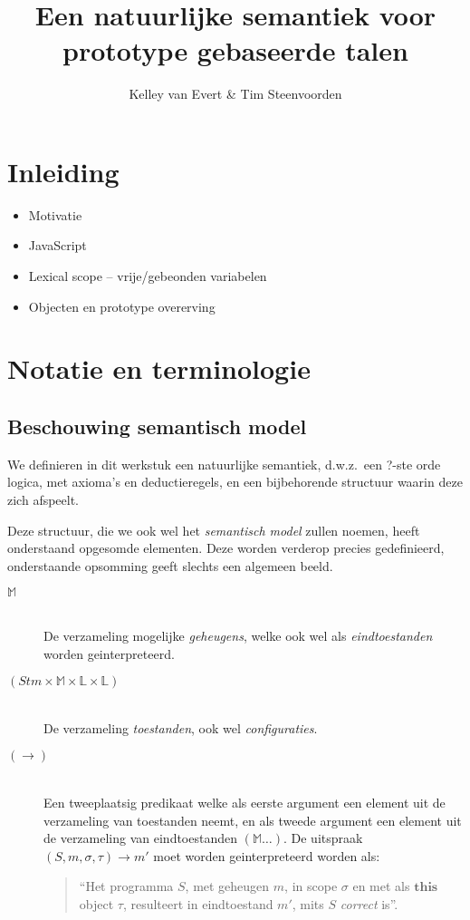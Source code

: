\documentclass
  [11pt,
   paper=a4,
   cleardouble=plain,
   chapterprefix=true,
   parskip=half,
   draft=true]
  {scrbook}
\newcommand{\<}
  {\ensuremath{\langle}}
\renewcommand{\>}
  {\ensuremath{\rangle}}
\begin{document}
\title{Een natuurlijke semantiek voor prototype gebaseerde talen}
\author{Kelley van Evert \& Tim Steenvoorden}
\maketitle

\frontmatter

\tableofcontents

\mainmatter

\chapter{Inleiding}

\begin{itemize}
	\item Motivatie
	\item JavaScript
	\item Lexical scope -- vrije/gebeonden variabelen
	\item Objecten en prototype overerving
\end{itemize}

\chapter{Notatie en terminologie}

\section{Beschouwing semantisch model}

We definieren in dit werkstuk een natuurlijke semantiek, d.w.z.~een ?-ste orde logica, met axioma's en deductieregels, en een bijbehorende structuur waarin deze zich afspeelt.

Deze structuur, die we ook wel het \emph{semantisch model} zullen noemen, heeft onderstaand opgesomde elementen. Deze worden verderop precies gedefinieerd, onderstaande opsomming geeft slechts een algemeen beeld.

\begin{description}
	\item[$\mathbb{M}$]\hfill\\ De verzameling mogelijke \emph{geheugens}, welke ook wel als \emph{eindtoestanden} worden geinterpreteerd.
	\item[$(\mathit{Stm} \times \mathbb{M} \times \mathbb{L} \times \mathbb{L})$]\hfill\\ De verzameling \emph{toestanden}, ook wel \emph{configuraties}.
	\item[$(\longrightarrow)$]\hfill\\ Een tweeplaatsig predikaat welke als eerste argument een element uit de verzameling van toestanden neemt, en als tweede argument een element uit de verzameling van eindtoestanden $(\mathbb{M}\dots)$. De uitspraak $(S, m, \sigma, \tau) \longrightarrow m'$ moet worden geinterpreteerd worden als:
	\begin{quote} ``Het programma $S$, met geheugen $m$, in scope $\sigma$ en met als $\mathbf{this}$ object $\tau$, resulteert in eindtoestand $m'$, mits $S$ \emph{correct} is''. \end{quote}
\end{description}
\end{document}
